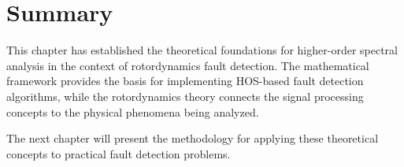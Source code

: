 \section{Summary}

This chapter has established the theoretical foundations for higher-order spectral analysis in the context of rotordynamics fault detection. The mathematical framework provides the basis for implementing HOS-based fault detection algorithms, while the rotordynamics theory connects the signal processing concepts to the physical phenomena being analyzed.

The next chapter will present the methodology for applying these theoretical concepts to practical fault detection problems.
